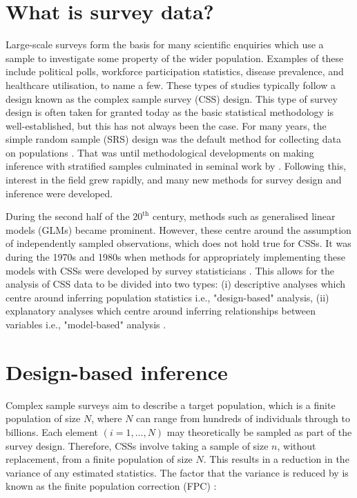 \section{What is survey data?}

Large-scale surveys form the basis for many scientific enquiries which use a sample to investigate some property of the wider population. Examples of these include political polls, workforce participation statistics, disease prevalence, and healthcare utilisation, to name a few. These types of studies typically follow a design known as the complex sample survey (CSS) design. This type of survey design is often taken for granted today as the basic statistical methodology is well-established, but this has not always been the case. For many years, the simple random sample (SRS) design was the default method for collecting data on populations \citep{heeringa2017}. That was until methodological developments on making inference with stratified samples culminated in seminal work by \citet{neyman1934}. Following this, interest in the field grew rapidly, and many new methods for survey design and inference were developed. 

During the second half of the $20^{\text{th}}$ century, methods such as generalised linear models (GLMs) became prominent. However, these centre around the assumption of independently sampled observations, which does not hold true for CSSs. It was during the 1970s and 1980s when methods for appropriately implementing these models with CSSs were developed by survey statisticians \citep{heeringa2017}. This allows for the analysis of CSS data to be divided into two types: (i) descriptive analyses which centre around inferring population statistics i.e., "design-based" analysis, (ii) explanatory analyses which centre around inferring relationships between variables i.e., "model-based" analysis \citep{heeringa2017}.

\section{Design-based inference}

Complex sample surveys aim to describe a target population, which is a finite population of size $N$, where $N$ can range from hundreds of individuals through to billions. Each element $(i = 1, ..., N)$ may theoretically be sampled as part of the survey design. Therefore, CSSs involve taking a sample of size $n$, without replacement, from a finite population of size $N$. This results in a reduction in the variance of any estimated statistics. The factor that the variance is reduced by is known as the finite population correction (FPC) \citep{heeringa2017}:

